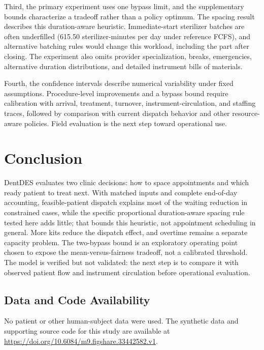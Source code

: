 \documentclass[conference]{IEEEtran}
\begin{document}
Third, the primary experiment uses one bypass limit, and the supplementary bounds characterize a tradeoff rather than a policy optimum. The spacing result describes this duration-aware heuristic. Immediate-start sterilizer batches are often underfilled (615.50 sterilizer-minutes per day under reference FCFS), and alternative batching rules would change this workload, including the part after closing. The experiment also omits provider specialization, breaks, emergencies, alternative duration distributions, and detailed instrument bills of materials.

Fourth, the confidence intervals describe numerical variability under fixed assumptions. Procedure-level improvements and a bypass bound require calibration with arrival, treatment, turnover, instrument-circulation, and staffing traces, followed by comparison with current dispatch behavior and other resource-aware policies. Field evaluation is the next step toward operational use.

\section{Conclusion}
DentDES evaluates two clinic decisions: how to space appointments and which ready patient to treat next. With matched inputs and complete end-of-day accounting, feasible-patient dispatch explains most of the waiting reduction in constrained cases, while the specific proportional duration-aware spacing rule tested here adds little; that bounds this heuristic, not appointment scheduling in general. More kits reduce the dispatch effect, and overtime remains a separate capacity problem. The two-bypass bound is an exploratory operating point chosen to expose the mean-versus-fairness tradeoff, not a calibrated threshold. The model is verified but not validated: the next step is to compare it with observed patient flow and instrument circulation before operational evaluation.

\begin{samepage}
\section*{Data and Code Availability}
No patient or other human-subject data were used. The synthetic data and supporting source code for this study are available at \mbox{\url{https://doi.org/10.6084/m9.figshare.33442582.v1}}.
\end{samepage}
\end{document}

